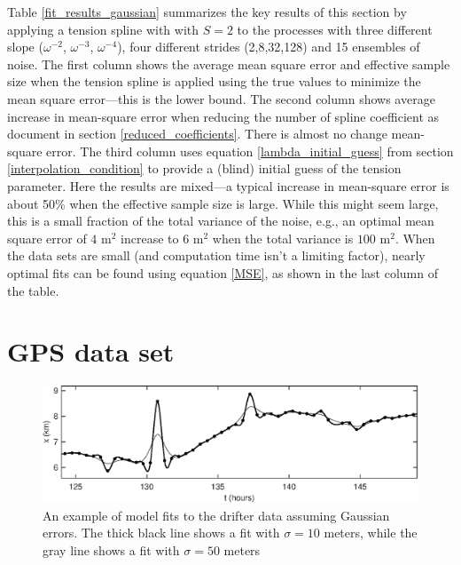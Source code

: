 \documentclass[10pt,journal]{IEEEtran}
\begin{document}
Table \ref{fit_results_gaussian} summarizes the key results of this section by applying a tension spline with with $S=2$ to the processes with three different slope ($\omega^{-2}$, $\omega^{-3}$, $\omega^{-4}$), four different strides (2,8,32,128) and 15 ensembles of noise. The first column shows the average mean square error and effective sample size when the tension spline is applied using the true values to minimize the mean square error---this is the lower bound. The second column shows average increase in mean-square error when reducing the number of spline coefficient as document in section \ref{reduced_coefficients}. There is almost no change mean-square error. The third column uses equation \ref{lambda_initial_guess} from section \ref{interpolation_condition} to provide a (blind) initial guess of the tension parameter. Here the results are mixed---a typical increase in mean-square error is about 50\% when the effective sample size is large. While this might seem large, this is a small fraction of the total variance of the noise, e.g., an optimal mean square error of $4$ m$^2$ increase to $6$ m$^2$ when the total variance is $100$ m$^2$. When the data sets are small (and computation time isn't a limiting factor), nearly optimal fits can be found using equation \ref{MSE}, as shown in the last column of the table.

\section{GPS data set}
\label{sec:drifter_data_set}

\begin{figure}[t]
  \centerline{\includegraphics[width=39pc,angle=0]{figures/gaussianfit}}
  
  \caption{An example of model fits to the drifter data assuming Gaussian errors. The thick black line shows a fit with $\sigma=10$ meters, while the gray line shows a fit with $\sigma=50$ meters}
  \label{gaussianfit}
\end{figure}
\end{document}
